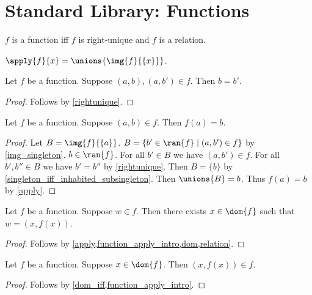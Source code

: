 \section{Standard Library: Functions}

\begin{abbreviation}\label{function}
    $f$ is a function iff $f$ is right-unique and $f$ is a relation.
\end{abbreviation}

\begin{definition}\label{apply}
    $\apply{f}{x} = \unions{\img{f}{\{x\}}}$.
\end{definition}

\begin{proposition}\label{function_rightunique}
    Let $f$ be a function.
    Suppose $(a,b), (a, b')\in f$.
    Then $b = b'$.
\end{proposition}
\begin{proof}
    Follows by \cref{rightunique}.
\end{proof}

\begin{proposition}\label{function_apply_intro}
    Let $f$ be a function.
    Suppose $(a,b)\in f$.
    Then $f(a) = b$.
\end{proposition}
\begin{proof}
    Let $B = \img{f}{\{a\}}$.
    $B = \{b'\in\ran{f}\mid (a,b')\in f \}$ by \cref{img_singleton}.
    $b\in\ran{f}$.
    For all $b'\in  B$ we have $(a, b')\in f$.
    For all $b', b''\in  B$ we have $b' = b''$ by \cref{rightunique}.
    Then $B = \{b\}$ by \cref{singleton_iff_inhabited_subsingleton}.
    Then $\unions{B} = b$.
    Thus $f(a) = b$ by \cref{apply}.
\end{proof}

\begin{proposition}\label{function_member_elim}
    Let $f$ be a function.
    Suppose $w\in f$.
    Then there exists $x\in\dom{f}$ such that $w = (x, f(x))$.
\end{proposition}
\begin{proof}
    Follows by \cref{apply,function_apply_intro,dom,relation}.
\end{proof}

\begin{proposition}\label{function_apply_elim}
    Let $f$ be a function.
    Suppose $x\in\dom{f}$.
    Then $(x,f(x))\in f$.
\end{proposition}
\begin{proof}
    Follows by \cref{dom_iff,function_apply_intro}.
\end{proof}

